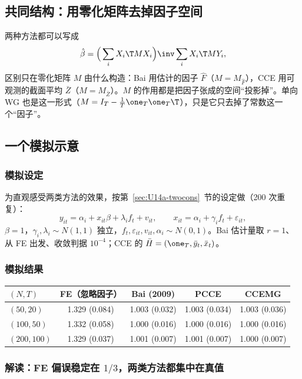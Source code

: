 \subsection{共同结构：用零化矩阵去掉因子空间}

两种方法都可以写成
\[
\hat\beta=\Big(\sum_iX_i\T MX_i\Big)\inv\sum_iX_i\T MY_i ,
\]
区别只在零化矩阵 $M$ 由什么构造：Bai 用估计的因子 $\hat F$（$M=M_{\hat F}$），CCE 用可观测的截面平均 $\bar Z$（$M=M_{\bar Z}$）。$M$ 的作用都是把因子张成的空间“投影掉”。单向 WG 也是这一形式（$M=I_T-\frac1T\one_T\one_T\T$），只是它只去掉了常数这一个“因子”。

\subsection{一个模拟示意}

\subsubsection{模拟设定}

为直观感受两类方法的效果，按第~\ref{sec:U14a-twocons}~节的设定做（200 次重复）：
\[
y_{it}=\alpha_i+x_{it}\beta+\lambda_if_t+v_{it},\qquad x_{it}=\alpha_i+\gamma_if_t+\varepsilon_{it},
\]
$\beta=1$，$\gamma_i,\lambda_i\sim N(1,1)$ 独立，$f_t,\varepsilon_{it},v_{it},\alpha_i\sim N(0,1)$。Bai 估计量取 $r=1$、从 FE 出发、收敛判据 $10^{-4}$；CCE 的 $\bar H=(\one_T,\bar y_t,\bar x_t)$。

\subsubsection{模拟结果}

\begin{center}
\small
\begin{tabular}{lcccc}
\toprule
$(N,T)$ & FE（忽略因子） & Bai (2009) & PCCE & CCEMG\\
\midrule
$(50,20)$ & 1.329 (0.084) & 1.003 (0.032) & 1.003 (0.034) & 1.003 (0.036)\\
$(100,50)$ & 1.332 (0.058) & 1.000 (0.016) & 1.000 (0.016) & 1.000 (0.016)\\
$(200,100)$ & 1.329 (0.037) & 1.001 (0.007) & 1.001 (0.007) & 1.000 (0.007)\\
\bottomrule
\end{tabular}
\end{center}

\subsubsection{解读：FE 偏误稳定在 \texorpdfstring{$1/3$}{1/3}，两类方法都集中在真值}

